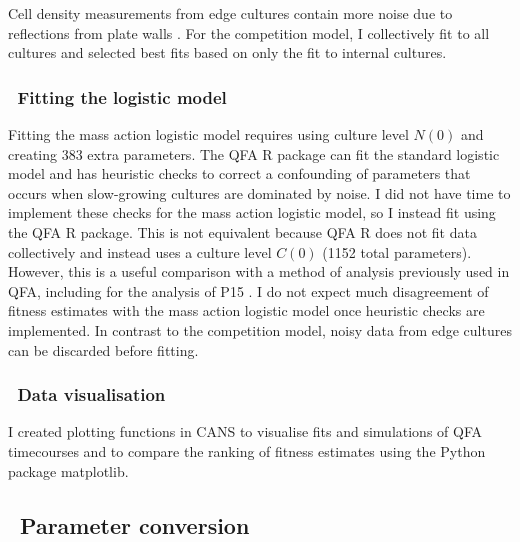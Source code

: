 Cell density measurements from edge cultures contain more noise due to
reflections from plate walls \citep{Lawless2010}. For the competition
model, I collectively fit to all cultures and selected best fits based
on only the fit to internal cultures.


\subsubsection{\thesubsubsection~Fitting the logistic model}

Fitting the mass action logistic model requires using culture level
\(N(0)\) and creating 383 extra parameters. The QFA R package
\citep{qfa2016} can fit the standard logistic model and has heuristic
checks to correct a confounding of parameters that occurs when
slow-growing cultures are dominated by noise. I did not have time to
implement these checks for the mass action logistic model, so I
instead fit using the QFA R package. This is not equivalent because
QFA R does not fit data collectively and instead uses a culture level
\(C(0)\) (1152 total parameters). However, this is a useful comparison
with a method of analysis previously used in QFA, including for the
analysis of P15 \citep{Addinall2011}. I do not expect much
disagreement of fitness estimates with the mass action logistic model
once heuristic checks are implemented. In contrast to the competition
model, noisy data from edge cultures can be discarded before fitting.

\subsubsection{\thesubsubsection~Data visualisation}

I created plotting functions in CANS to visualise fits and simulations
of QFA timecourses and to compare the ranking of fitness estimates
using the Python package matplotlib.

\subsection{\thesubsection~Parameter conversion}
\label{sec:parameter_conversion}

